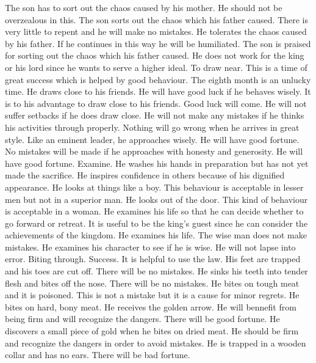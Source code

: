 	{The son has to sort out the chaos caused by his mother. He should not be overzealous in this.}
	{The son sorts out the chaos which his father caused. There is very little to repent
		and he will make no mistakes.}
	{He tolerates the chaos caused by his father. If he continues in this way he will
		be humiliated.}
	{The son is praised for sorting out the chaos which his father caused.}
	{He does not work for the king or his lord since he wants to serve a higher ideal.}
\or {}
	{To draw near. This is a time of great success which is helped by good behaviour. The eighth
		month is an unlucky time.}
	{He draws close to his friends. He will have good luck if he behaves wisely.}
	{It is to his advantage to draw close to his friends. Good luck will come.}
	{He will not suffer setbacks if he does draw close. He will not make any mistakes if
		he thinks his activities through properly.}
	{Nothing will go wrong when he arrives in great style.}
	{Like an eminent leader, he approaches wisely. He will have good fortune.}
	{No mistakes will be made if he approaches with honesty and generosity. He will have
		good fortune.}
\or {}
	{Examine. He washes his hands in preparation but has not yet made the sacrifice. He inspires
		confidence in others because of his dignified appearance.}
	{He looks at things like a boy. This behaviour is acceptable in lesser men but not in a
		superior man.}
	{He looks out of the door. This kind of behaviour is acceptable in a woman.}
	{He examines his life so that he can decide whether to go forward or retreat.}
	{It is useful to be the king's guest since he can consider the achievements of the kingdom.}
	{He examines his life. The wise man does not make mistakes.}
	{He examines his character to see if he is wise. He will not lapse into error.}
\or {}
	{Biting through. Success. It is helpful to use the law.}
	{His feet are trapped and his toes are cut off. There will be no mistakes.}
	{He sinks his teeth into tender flesh and bites off the nose. There will be no mistakes.}
	{He bites on tough meat and it is poisoned. This is not a mistake but it is a cause
		for minor regrets.}
	{He bites on hard, bony meat. He receives the golden arrow. He will bennefit from being
		firm and will recognize the dangers. There will be good fortune.}
	{He discovers a small piece of gold when he bites on dried meat. He should be firm and
		recognize the dangers in order to avoid mistakes.}
	{He is trapped in a wooden collar and has no ears. There will be bad fortune.}
\or {}
